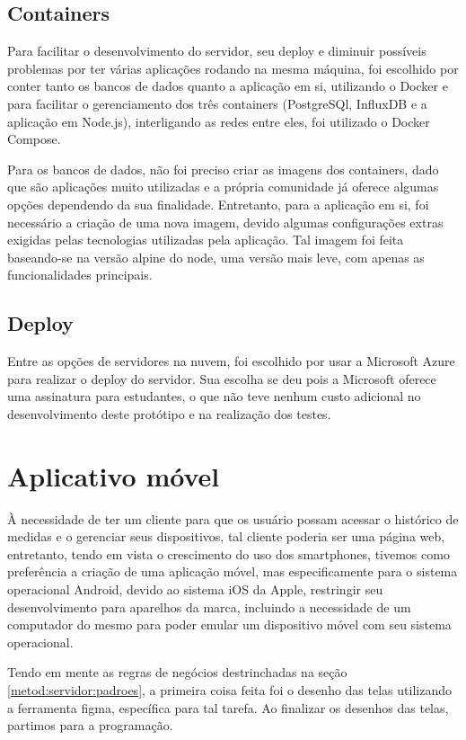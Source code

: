 \subsection{Containers}
\label{metod:servidor:containers}
Para facilitar o desenvolvimento do servidor, seu deploy e diminuir possíveis problemas por ter várias aplicações rodando na mesma máquina, foi escolhido por conter tanto os bancos de dados quanto a aplicação em si, utilizando o Docker e para facilitar o gerenciamento dos três containers (PostgreSQl, InfluxDB e a aplicação em Node.js), interligando as redes entre eles, foi utilizado o Docker Compose.

Para os bancos de dados, não foi preciso criar as imagens dos containers, dado que são aplicações muito utilizadas e a própria comunidade já oferece algumas opções dependendo da sua finalidade. Entretanto, para a aplicação em si, foi necessário a criação de uma nova imagem, devido algumas configurações extras exigidas pelas tecnologias utilizadas pela aplicação. Tal imagem foi feita baseando-se na versão alpine do node, uma versão mais leve, com apenas as funcionalidades principais.

\subsection{Deploy}
\label{metod:servidor:deploy}
Entre as opções de servidores na nuvem, foi escolhido por usar a Microsoft Azure para realizar o deploy do servidor. Sua escolha se deu pois a Microsoft oferece uma assinatura para estudantes, o que não teve nenhum custo adicional no desenvolvimento deste protótipo e na realização dos testes.

\section{Aplicativo móvel}
\label{metod:app}
À necessidade de ter um cliente para que os usuário possam acessar o histórico de medidas e o gerenciar seus dispositivos, tal cliente poderia ser uma página web, entretanto, tendo em vista o crescimento do uso dos smartphones, tivemos como preferência a criação de uma aplicação móvel, mas especificamente para o sistema operacional Android, devido ao sistema iOS da Apple, restringir seu desenvolvimento para aparelhos da marca, incluindo a necessidade de um computador do mesmo para poder emular um dispositivo móvel com seu sistema operacional.

Tendo em mente as regras de negócios destrinchadas na seção \ref{metod:servidor:padroes}, a primeira coisa feita foi o desenho das telas utilizando a ferramenta figma, específica para tal tarefa. Ao finalizar os desenhos das telas, partimos para a programação.

